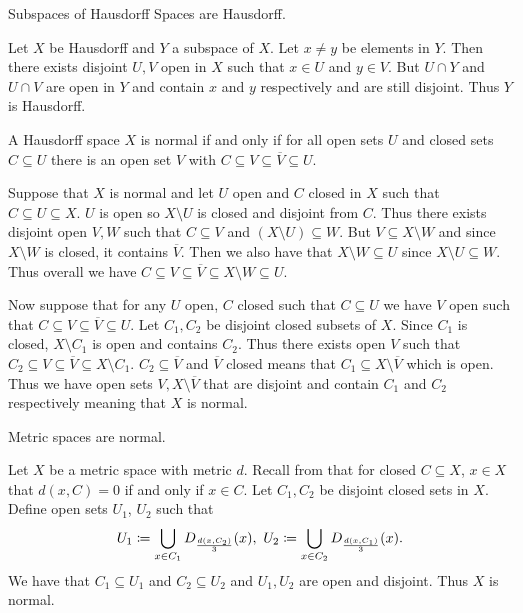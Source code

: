 \documentclass[letterpaper, 11pt, oneside]{book}
\begin{document}
\begin{exercise}\label{exercise: Bredon 1.5.5}
  Subspaces of Hausdorff Spaces are Hausdorff.
\end{exercise}
\begin{pf}
  Let $X$ be Hausdorff and $Y$ a subspace of $X$.
  Let $x \neq y$ be elements in $Y$.
  Then there exists disjoint $U, V$ open in $X$ such that $x \in U$ and $y \in V$.
  But $U \cap Y$ and $U \cap V$ are open in $Y$ and contain $x$ and $y$ respectively and are still disjoint.
  Thus $Y$ is Hausdorff.
\end{pf}

\begin{exercise}\label{exercise: bredon_1.5.6}
  A Hausdorff space $X$ is normal if and only if for all open sets $U$ and closed sets $C \subseteq U$ there is an open set $V$ with $C \subseteq V \subseteq \overline{V} \subseteq U$.
\end{exercise}
\begin{pf}
  Suppose that $X$ is normal and let $U$ open and $C$ closed in $X$ such that $C \subseteq U \subseteq X$.
  $U$ is open so $X \setminus U$ is closed and disjoint from $C$.
  Thus there exists disjoint open $V, W$ such that $C \subseteq V$ and $(X \setminus U) \subseteq W$.
  But $V \subseteq X \setminus W$ and since $X \setminus W$ is closed, it contains $\overline{V}$.
  Then we also have that $X \setminus W \subseteq U$ since $X \setminus U \subseteq W$.
  Thus overall we have $C \subseteq V \subseteq \overline{V} \subseteq X \setminus W \subseteq U$.

  Now suppose that for any $U$ open, $C$ closed such that $C \subseteq U$ we have $V$ open such that $C \subseteq V \subseteq \overline{V} \subseteq U$.
  Let $C_{1}, C_{2}$ be disjoint closed subsets of $X$.
  Since $C_{1}$ is closed, $X \setminus C_{1}$ is open and contains $C_{2}$.
  Thus there exists open $V$ such that $C_{2} \subseteq V \subseteq \overline{V} \subseteq X \setminus C_{1}$.
  $C_{2} \subseteq \overline{V}$ and $\overline{V}$ closed means that $C_{1} \subseteq X \setminus \overline{V}$ which is open.
  Thus we have open sets $V, X \setminus \overline{V}$ that are disjoint and contain $C_{1}$ and $C_{2}$ respectively meaning that $X$ is normal.
\end{pf}

\begin{exercise}
  Metric spaces are normal.
\end{exercise}
\begin{pf}
  Let $X$ be a metric space with metric $d$.
  Recall from  that for closed $C \subseteq X$, $x \in X$ that $d(x, C) = 0$ if and only if $x \in C$.
  Let $C_{1}, C_{2}$ be disjoint closed sets in $X$.
  Define open sets $U_{1}$, $U_{2}$ such that
  \[
    U_{1} \coloneqq \bigcup_{x \in C_{1}} D_{\frac{d(x, C_{2})}{3}}(x),~ U_{2} \coloneqq \bigcup_{x \in C_{2}} D_{\frac{d(x, C_{1})}{3}}(x).
  \]
  We have that $C_{1} \subseteq U_{1}$ and $C_{2} \subseteq U_{2}$ and $U_{1}, U_{2}$ are open and disjoint.
  Thus $X$ is normal.
\end{pf}
\end{document}
